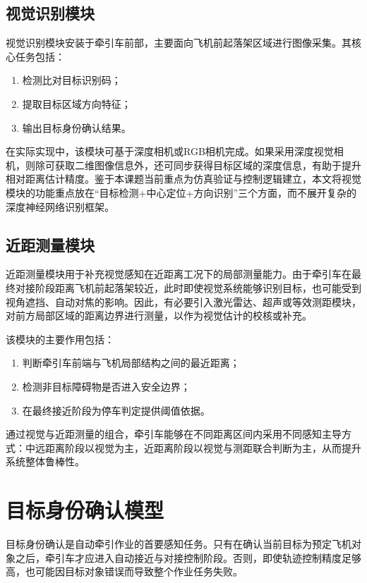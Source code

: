 \subsection{视觉识别模块}

视觉识别模块安装于牵引车前部，主要面向飞机前起落架区域进行图像采集。其核心任务包括：
\begin{enumerate}[label=（\arabic*）,leftmargin=4em]
\item 检测比对目标识别码；
\item 提取目标区域方向特征；
\item 输出目标身份确认结果。
\end{enumerate}

在实际实现中，该模块可基于深度相机或RGB相机完成\cite{ref29}。如果采用深度视觉相机，则除可获取二维图像信息外，还可同步获得目标区域的深度信息，有助于提升相对距离估计精度。鉴于本课题当前重点为仿真验证与控制逻辑建立，本文将视觉模块的功能重点放在``目标检测+中心定位+方向识别''三个方面，而不展开复杂的深度神经网络识别框架\cite{ref29,ref30}。

\subsection{近距测量模块}

近距测量模块用于补充视觉感知在近距离工况下的局部测量能力。由于牵引车在最终对接阶段距离飞机前起落架较近，此时即使视觉系统能够识别目标，也可能受到视角遮挡、自动对焦的影响。因此，有必要引入激光雷达、超声或等效测距模块，对前方局部区域的距离边界进行测量，以作为视觉估计的校核或补充\cite{ref18}。

该模块的主要作用包括：
\begin{enumerate}[label=（\arabic*）,leftmargin=4em]
\item 判断牵引车前端与飞机局部结构之间的最近距离；
\item 检测非目标障碍物是否进入安全边界；
\item 在最终接近阶段为停车判定提供阈值依据。
\end{enumerate}

通过视觉与近距测量的组合，牵引车能够在不同距离区间内采用不同感知主导方式：中远距离阶段以视觉为主，近距离阶段以视觉与测距联合判断为主，从而提升系统整体鲁棒性。

\section{目标身份确认模型}

目标身份确认是自动牵引作业的首要感知任务。只有在确认当前目标为预定飞机对象之后，牵引车才应进入自动接近与对接控制阶段。否则，即使轨迹控制精度足够高，也可能因目标对象错误而导致整个作业任务失败。

